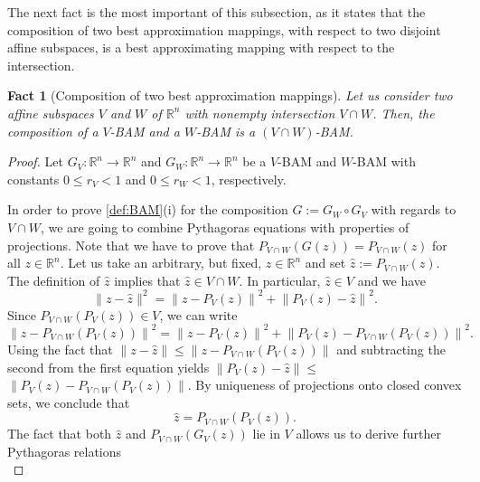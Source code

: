 \documentclass[smallextended,numbook,nospthms]{svjour3}
\theoremstyle{plain}
\newtheorem{fact}[theorem]{Fact}
\theoremstyle{definition}
\def\RR{\mathds R}
\begin{document}
The next fact is the most important of this subsection, as it states that the composition of two best approximation mappings, with respect to two disjoint affine subspaces, is a best approximating mapping with respect to the intersection.
\begin{fact}[Composition of two best approximation mappings]\label{fact:BAM comp}
	Let us consider two affine subspaces $V$ and $W$ of $\RR^{n}$ with nonempty intersection $V \cap W$. Then, the composition of a $V$-BAM and a $W$-BAM is a $(V \cap W)$-BAM.
\end{fact}
\begin{proof}
	Let $G_{V}: \RR^{n} \rightarrow \RR^{n}$ and $G_{W}: \RR^{n} \rightarrow \RR^{n}$ be a $V$-BAM and $W$-BAM with constants $0 \leq r_{V}<1$ and $0 \leq r_{W}<1$, respectively.
	
	In order to prove \cref{def:BAM}(i) for the composition $G:=G_{W} \circ G_{V}$ with regards to $V \cap W$, we are going to combine Pythagoras equations with properties of projections. Note that we have to prove that $P_{V \cap W}(G(z))=P_{V \cap W}(z)$ for all $z \in \RR^{n}$.
	Let us take an arbitrary, but fixed, $z \in \RR^{n}$ and set $\hat{z}:=P_{V \cap W}(z)$. The definition of $\hat{z}$ implies that $\hat{z} \in V \cap W$. In particular, $\hat{z} \in V$ and we have
	\begin{equation}\label{eq:BAM comp i1}
		\|z-\hat{z}\|^{2}=\left\|z-P_{V}(z)\right\|^{2}+\left\|P_{V}(z)-\hat{z}\right\|^{2}.	
	\end{equation}
	Since $P_{V \cap W}\left(P_{V}(z)\right) \in V$, we can write
	\begin{equation}\label{eq:BAM comp i2}
		\left\|z-P_{V \cap W}\left(P_{V}(z)\right)\right\|^{2}=\left\|z-P_{V}(z)\right\|^{2}+\left\|P_{V}(z)-P_{V \cap W}\left(P_{V}(z)\right)\right\|^{2}.
	\end{equation}
	Using the fact that $\|z-\hat{z}\| \leq\left\|z-P_{V \cap W}\left(P_{V}(z)\right)\right\|$ and subtracting the second from the first equation yields $\left\|P_{V}(z)-\hat{z}\right\| \leq$ $\left\|P_{V}(z)-P_{V \cap W}\left(P_{V}(z)\right)\right\|$. By uniqueness of projections onto closed convex sets, we conclude that
	\begin{equation}\label{eq:BAM comp i3}
		\hat{z}=P_{V \cap W}\left(P_{V}(z)\right).
	\end{equation}
	The fact that both $\hat{z}$ and $P_{V \cap W}\left(G_{V}(z)\right)$ lie in $V$ allows us to derive further Pythagoras relations
	\begin{equation}\label{eq:BAM comp i4}

\end{equation}
\end{proof}
\end{document}
